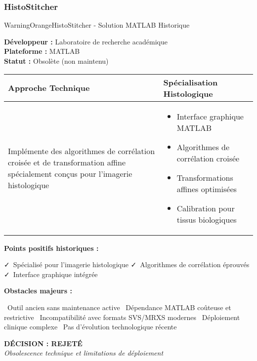 \documentclass[12pt,a4paper]{report}
\newcommand{\pro}[1]{\textcolor{SuccessGreen}{\faCheck\ #1}}
\newcommand{\con}[1]{\textcolor{DangerRed}{\faTimes\ #1}}
\begin{document}
\subsubsection{HistoStitcher}

\begin{techbox}{WarningOrange}{HistoStitcher - Solution MATLAB Historique}

\textbf{Développeur :} Laboratoire de recherche académique \\
\textbf{Plateforme :} MATLAB \\
\textbf{Statut :} Obsolète (non maintenu)

\vspace{0.5cm}

\begin{tabularx}{\textwidth}{|X|X|}
\hline
\rowcolor{LightGray}
\textbf{Approche Technique} & \textbf{Spécialisation Histologique} \\
\hline
Implémente des algorithmes de corrélation croisée et de transformation affine spécialement conçus pour l'imagerie histologique &
\begin{itemize}[nosep]
\item Interface graphique MATLAB
\item Algorithmes de corrélation croisée
\item Transformations affines optimisées
\item Calibration pour tissus biologiques
\end{itemize} \\
\hline
\end{tabularx}

\vspace{0.5cm}

\textbf{Points positifs historiques :}
\begin{itemize}[leftmargin=*]
    \pro{Spécialisé pour l'imagerie histologique}
    \pro{Algorithmes de corrélation éprouvés}
    \pro{Interface graphique intégrée}
\end{itemize}

\textbf{Obstacles majeurs :}
\begin{itemize}[leftmargin=*]
    \con{Outil ancien sans maintenance active}
    \con{Dépendance MATLAB coûteuse et restrictive}
    \con{Incompatibilité avec formats SVS/MRXS modernes}
    \con{Déploiement clinique complexe}
    \con{Pas d'évolution technologique récente}
\end{itemize}

\begin{center}
\textbf{\textcolor{DangerRed}{DÉCISION : REJETÉ}}\\
\textit{Obsolescence technique et limitations de déploiement}
\end{center}

\end{techbox}
\end{document}
